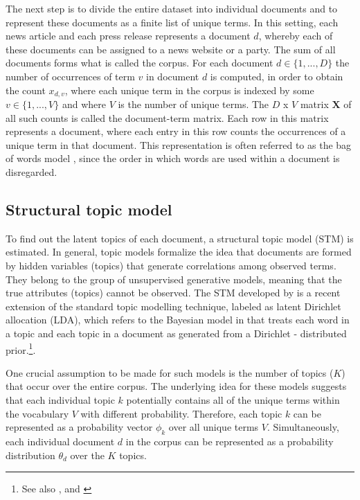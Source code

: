 \documentclass[12pt,a4paper,notitlepage]{article}
\begin{document}
The next step is to divide the entire dataset into individual documents and to represent these documents as a finite list of unique terms. In this setting, each news article and each press release represents a document $d$, whereby each of these documents can be assigned to a news website or a party. The sum of all documents forms what is called the corpus. For each document $d \in \lbrace 1,...,D \rbrace$ the number of occurrences of term $v$ in document $d$ is computed, in order to obtain the count $x_{d,v}$, where each unique term in the corpus is indexed by some $v \in \lbrace 1,...,V \rbrace$ and where $V$ is the number of unique terms. The $D$ x $V$ matrix $\boldsymbol{X}$ of all such counts is called the document-term matrix. Each row in this matrix represents a document, where each entry in this row counts the occurrences of a unique term in that document. This representation is often referred to as the bag of words model \citep{gentzkow_text_2017}, since the order in which words are used within a document is disregarded.

\subsection{Structural topic model}\label{ch_stm}

To find out the latent topics of each document, a structural topic model (STM) is estimated. In general, topic models formalize the idea that documents are formed by hidden variables (topics) that generate correlations among observed terms. They belong to the group of unsupervised generative models, meaning that the true attributes (topics) cannot be observed. The STM developed by \citet{roberts_model_2016} is a recent extension of the standard topic modelling technique, labeled as latent Dirichlet allocation (LDA), which refers to the Bayesian model in \citet{blei_latent_2003} that treats each word in a topic and each topic in a document as generated from a Dirichlet - distributed prior.\footnote{See also \citet{griffiths_probabilistic_2002}, \citet{griffiths_finding_2004} and \citet{hofmann_probabilistic_1999}}. 

 One crucial assumption to be made for such models is the number of topics ($K$) that occur over the entire corpus. The underlying idea for these models suggests that each individual topic $k$ potentially contains all of the unique terms within the vocabulary $V$ with different probability. Therefore, each topic $k$ can be represented as a probability vector $\phi_k$ over all unique terms $V$. Simultaneously, each individual document $d$ in the corpus can be represented as a probability distribution $\theta_d$ over the $K$ topics.
\end{document}
